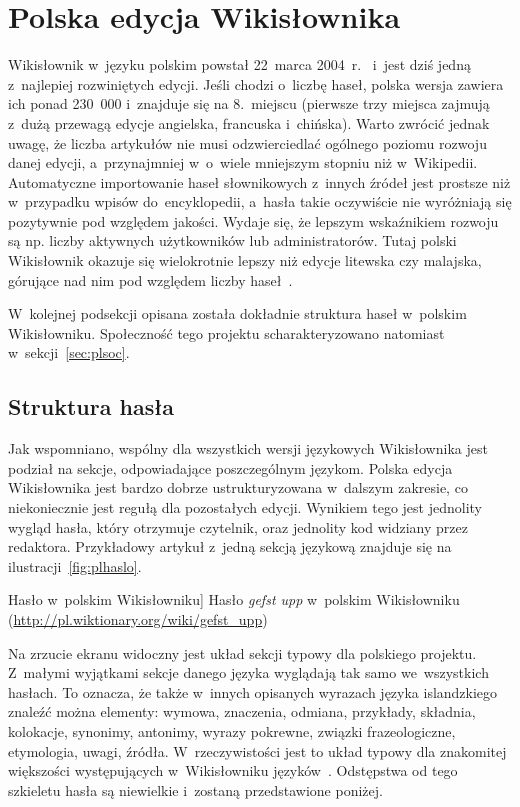 \section{Polska edycja Wikisłownika}
\label{sec:plwikt}
Wikisłownik w~języku polskim powstał 22~marca 2004~r.~\cite{wikt:home} i~jest dziś jedną z~najlepiej rozwiniętych edycji. Jeśli chodzi o~liczbę haseł, polska wersja zawiera ich ponad 230~000 i~znajduje się na 8.~miejscu (pierwsze trzy miejsca zajmują z~dużą przewagą edycje angielska, francuska i~chińska). Warto zwrócić jednak uwagę, że liczba artykułów nie musi odzwierciedlać ogólnego poziomu rozwoju danej edycji, a~przynajmniej w~o~wiele mniejszym stopniu niż w~Wikipedii. Automatyczne importowanie haseł słownikowych z~innych źródeł jest prostsze niż w~przypadku wpisów do~encyklopedii, a~hasła takie oczywiście nie wyróżniają się pozytywnie pod względem jakości. Wydaje się, że lepszym wskaźnikiem rozwoju są np. liczby aktywnych użytkowników lub administratorów. Tutaj polski Wikisłownik okazuje się wielokrotnie lepszy niż edycje litewska czy malajska, górujące nad nim pod względem liczby haseł~\cite{wikt:list}.

W~kolejnej podsekcji opisana została dokładnie struktura haseł w~polskim Wikisłowniku. Społeczność tego projektu scharakteryzowano natomiast w~sekcji~\ref{sec:plsoc}.

\subsection{Struktura hasła}
\label{wikt:structure}
Jak wspomniano, wspólny dla wszystkich wersji językowych Wikisłownika jest podział na sekcje, odpowiadające poszczególnym językom. Polska edycja Wikisłownika jest bardzo dobrze ustrukturyzowana w~dalszym zakresie, co niekoniecznie jest regułą dla pozostałych edycji. Wynikiem tego jest jednolity wygląd hasła, który otrzymuje czytelnik, oraz jednolity kod widziany przez redaktora. Przykładowy artykuł z~jedną sekcją językową znajduje się na ilustracji~\ref{fig:plhaslo}.

\begin{illustration}
	\caption
		[Hasło w~polskim Wikisłowniku]
		{Hasło \emph{gefst upp} w~polskim Wikisłowniku (\protect\url{http://pl.wiktionary.org/wiki/gefst_upp})}
	\label{fig:plhaslo}
\end{illustration}

Na zrzucie ekranu widoczny jest układ sekcji typowy dla polskiego projektu. Z~małymi wyjątkami sekcje danego języka wyglądają tak samo we~wszystkich hasłach. To oznacza, że także w~innych opisanych wyrazach języka islandzkiego znaleźć można elementy: wymowa, znaczenia, odmiana, przykłady, składnia, kolokacje, synonimy, antonimy, wyrazy pokrewne, związki frazeologiczne, etymologia, uwagi, źródła. W~rzeczywistości jest to układ typowy dla znakomitej większości występujących w~Wikisłowniku języków~\cite{wikt:zasady}. Odstępstwa od tego szkieletu hasła są niewielkie i~zostaną przedstawione poniżej.

